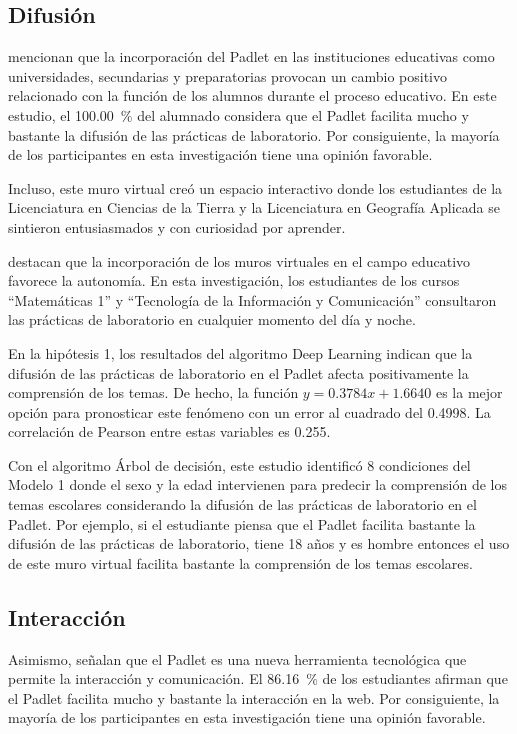 \documentclass[spanish]{textolivre}
\begin{document}
\subsection{Difusión}\label{sec-outras-estr}
\textcite{lee2023,siantuba2023} mencionan que la incorporación del Padlet en las instituciones educativas como universidades, secundarias y preparatorias provocan un cambio positivo relacionado con la función de los alumnos durante el proceso educativo. En este estudio, el 100.00~\% del alumnado considera que el Padlet facilita mucho y bastante la difusión de las prácticas de laboratorio. Por consiguiente, la mayoría de los participantes en esta investigación tiene una opinión favorable.

Incluso, este muro virtual creó un espacio interactivo donde los estudiantes de la Licenciatura en Ciencias de la Tierra y la Licenciatura en Geografía Aplicada se sintieron entusiasmados y con curiosidad por aprender.

\textcite{lee2023} destacan que la incorporación de los muros virtuales en el campo educativo favorece la autonomía. En esta investigación, los estudiantes de los cursos “Matemáticas 1” y “Tecnología de la Información y Comunicación” consultaron las prácticas de laboratorio en cualquier momento del día y noche.

En la hipótesis 1, los resultados del algoritmo Deep Learning indican que la difusión de las prácticas de laboratorio en el Padlet afecta positivamente la comprensión de los temas. De hecho, la función $y = 0.3784x + 1.6640$ es la mejor opción para pronosticar este fenómeno con un error al cuadrado del 0.4998. La correlación de Pearson entre estas variables es 0.255. 

Con el algoritmo Árbol de decisión, este estudio identificó 8 condiciones del Modelo 1 donde el sexo y la edad intervienen para predecir la comprensión de los temas escolares considerando la difusión de las prácticas de laboratorio en el Padlet.  Por ejemplo, si el estudiante piensa que el Padlet facilita bastante la difusión de las prácticas de laboratorio, tiene 18 años y es hombre entonces el uso de este muro virtual facilita bastante la comprensión de los temas escolares.


\subsection{Interacción}\label{sec-listas}
Asimismo, \textcite{almwzaiji2022} señalan que el Padlet es una nueva herramienta tecnológica que permite la interacción y comunicación. El 86.16~\% de los estudiantes afirman que el Padlet facilita mucho y bastante la interacción en la web. Por consiguiente, la mayoría de los participantes en esta investigación tiene una opinión favorable.
\end{document}
